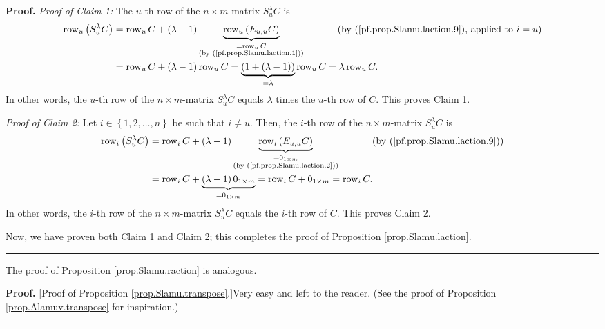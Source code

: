 \documentclass[numbers=enddot,12pt,final,onecolumn,notitlepage]{scrartcl}%
\theoremstyle{definition}
\newenvironment{proof}[1][Proof]{\noindent\textbf{#1.} }{\ \rule{0.5em}{0.5em}}
\begin{document}
\begin{proof}
\textit{Proof of Claim 1:} The $u$-th row of the $n\times m$-matrix
$S_{u}^{\lambda}C$ is%
\begin{align*}
\operatorname*{row}\nolimits_{u}\left(  S_{u}^{\lambda}C\right)   &
=\operatorname*{row}\nolimits_{u}C+\left(  \lambda-1\right)
\underbrace{\operatorname*{row}\nolimits_{u}\left(  E_{u,u}C\right)
}_{\substack{=\operatorname*{row}\nolimits_{u}C\\\text{(by
(\ref{pf.prop.Slamu.laction.1}))}}}\ \ \ \ \ \ \ \ \ \ \left(  \text{by
(\ref{pf.prop.Slamu.laction.9}), applied to }i=u\right) \\
&  =\operatorname*{row}\nolimits_{u}C+\left(  \lambda-1\right)
\operatorname*{row}\nolimits_{u}C=\underbrace{\left(  1+\left(  \lambda
-1\right)  \right)  }_{=\lambda}\operatorname*{row}\nolimits_{u}%
C=\lambda\operatorname*{row}\nolimits_{u}C.
\end{align*}
In other words, the $u$-th row of the $n\times m$-matrix $S_{u}^{\lambda}C$
equals $\lambda$ times the $u$-th row of $C$. This proves Claim 1.

\textit{Proof of Claim 2:} Let $i\in\left\{  1,2,\ldots,n\right\}  $ be such
that $i\neq u$. Then, the $i$-th row of the $n\times m$-matrix $S_{u}%
^{\lambda}C$ is%
\begin{align*}
\operatorname*{row}\nolimits_{i}\left(  S_{u}^{\lambda}C\right)   &
=\operatorname*{row}\nolimits_{i}C+\left(  \lambda-1\right)
\underbrace{\operatorname*{row}\nolimits_{i}\left(  E_{u,u}C\right)
}_{\substack{=0_{1\times m}\\\text{(by (\ref{pf.prop.Slamu.laction.2}))}%
}}\ \ \ \ \ \ \ \ \ \ \left(  \text{by (\ref{pf.prop.Slamu.laction.9})}\right)
\\
&  =\operatorname*{row}\nolimits_{i}C+\underbrace{\left(  \lambda-1\right)
0_{1\times m}}_{=0_{1\times m}}=\operatorname*{row}\nolimits_{i}C+0_{1\times
m}=\operatorname*{row}\nolimits_{i}C.
\end{align*}
In other words, the $i$-th row of the $n\times m$-matrix $S_{u}^{\lambda}C$
equals the $i$-th row of $C$. This proves Claim 2.

Now, we have proven both Claim 1 and Claim 2; this completes the proof of
Proposition \ref{prop.Slamu.laction}.
\end{proof}

The proof of Proposition \ref{prop.Slamu.raction} is analogous.

\begin{proof}
[Proof of Proposition \ref{prop.Slamu.transpose}.]Very easy and left to the
reader. (See the proof of Proposition \ref{prop.Alamuv.transpose} for inspiration.)
\end{proof}
\end{document}
